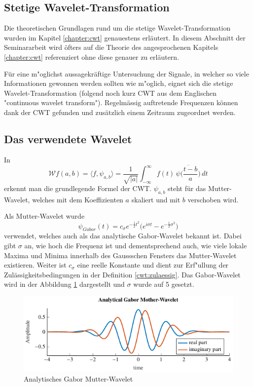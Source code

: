 \begin{refsection}
\section{Stetige Wavelet-Transformation}
Die theoretischen Grundlagen rund um die stetige Wavelet-Transformation wurden im Kapitel \ref{chapter:cwt} genauestens erläutert. 
In diesem Abschnitt der Seminararbeit wird öfters auf die Theorie des angesprochenen Kapitels \ref{chapter:cwt} referenziert ohne diese genauer zu erläutern. 

Für eine m"oglichst aussagekräftige Untersuchung der Signale, in welcher so viele Informationen gewonnen werden sollten wie m"oglich, eignet sich die stetige Wavelet-Transformation (folgend noch kurz CWT aus dem Englischen "continuous wavelet transform"). 
Regelmässig auftretende Frequenzen können dank der CWT gefunden und zusätzlich einem Zeitraum zugeordnet werden.
\subsection{Das verwendete Wavelet}
In
\begin{equation}
\mathcal{W}f (a,b)
=
\langle f,\psi_{a,b}\rangle
=
\frac{1}{\sqrt{|a|}}\int_{-\infty}^\infty f(t)\,\overline{
	\psi\biggl(\frac{t-b}{a}\biggr)}\,dt
\label{eq:cwt1}
\end{equation}
erkennt man die grundlegende Formel der CWT.
$\psi_{a,b}$ steht für das Mutter-Wavelet, welches mit dem Koeffizienten $a$ skaliert und mit $b$ verschoben wird.

Als Mutter-Wavelet wurde 
\begin{equation}
\psi_{Gabor}(t) =  c_{\sigma} e^{-\frac{1}{2}t^2} \biggl(e^{i \sigma t}- e^{-\frac{1}{2} \sigma^2} \biggr)
\label{eq:morlet}
\end{equation} \cite{online:Morlet}
verwendet, welches auch als das analytische Gabor-Wavelet bekannt ist.
%
Dabei gibt $\sigma$ an, wie hoch die Frequenz ist und dementsprechend auch, wie viele lokale Maxima und Minima innerhalb des Gaussschen Fensters das Mutter-Wavelet existieren.
%
Weiter ist $c_{\sigma}$ eine reelle Konstante und dient zur Erf"ullung der Zulässigkeitsbedingungen in der Definition \ref{cwt:zulaessig}.
Das Gabor-Wavelet wird in der Abbildung \ref{fig:gabor_plot} \space dargestellt und $\sigma$ wurde auf 5 gesetzt.

\begin{figure}
\centering
\includegraphics[width=1\textwidth]{papers/wwt/images/gabor.pdf}
\caption{Analytisches Gabor Mutter-Wavelet}
\label{fig:gabor_plot}
\end{figure}


\end{refsection}
